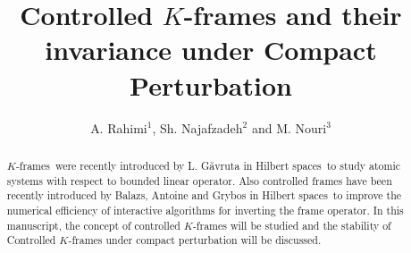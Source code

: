 \documentclass[11pt]{amsart}
\theoremstyle{definition}
\theoremstyle{remark}
\numberwithin{equation}{section}
\begin{document}
\title[Controlled $K$-frames and  their invariance under ...]
{Controlled $K$-frames and their invariance under Compact Perturbation }\author[A. Rahimi$^1$, Sh. Najafzadeh$^{2}$ and M. Nouri$^{3}$]{A. Rahimi$^1$, Sh. Najafzadeh$^{2}$ and M. Nouri$^{3}$ }
\address{$^1$Department of Mathematics, University of Maragheh, Maragheh, Iran.}

\address{ $^{2}$Department of Mathematics, Payame Noor University, Iran.}
\address{  $^{3}$Department of Mathematics, Payame Noor University, Iran.}


\begin{abstract}
{$K$-frames}\  were recently introduced by L. G\v{a}vruta in {Hilbert spaces}\ to study atomic systems with respect to bounded linear operator. Also controlled frames have been recently introduced by Balazs, Antoine and Grybos in {Hilbert spaces}\ to improve the numerical efficiency of interactive algorithms for inverting the frame operator. In this manuscript, the concept of controlled $K$-frames  will be studied  and the stability of Controlled $K$-frames  under compact perturbation will be discussed.
\end{abstract}
\maketitle
\end{document}
